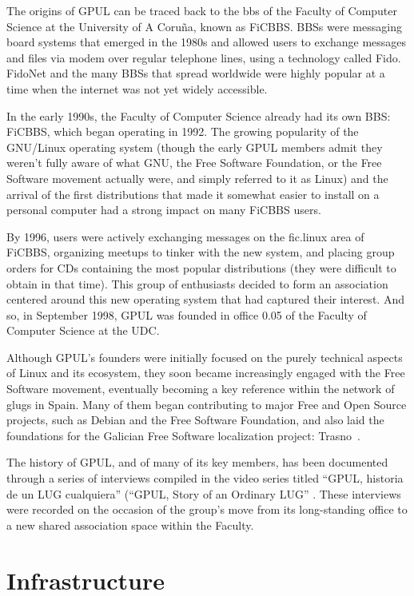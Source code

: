 The origins of GPUL can be traced back to the \gls{bbs} of the Faculty
of Computer Science at the University of A Coruña, known as
FiCBBS. BBSs were messaging board systems that emerged in the 1980s
and allowed users to exchange messages and files via modem over
regular telephone lines, using a technology called Fido. FidoNet and
the many BBSs that spread worldwide were highly popular at a time when
the internet was not yet widely accessible.

In the early 1990s, the Faculty of Computer Science already had its own
BBS: FiCBBS, which began operating in 1992. The growing popularity of the
GNU/Linux operating system (though the early GPUL members admit they
weren’t fully aware of what GNU, the Free Software Foundation, or the
Free Software movement actually were, and simply referred to it as Linux)
and the arrival of the first distributions that made it somewhat easier
to install on a personal computer had a strong impact on many FiCBBS users.

By 1996, users were actively exchanging messages on the fic.linux area
of FiCBBS, organizing meetups to tinker with the new system, and
placing group orders for CDs containing the most popular distributions
(they were difficult to obtain in that time). This group of enthusiasts
decided to form an association centered around this new operating system
that had captured their interest. And so, in September 1998, GPUL was
founded in office 0.05 of the Faculty of Computer Science at the UDC.

Although GPUL's founders were initially focused on the purely
technical aspects of Linux and its ecosystem, they soon became
increasingly engaged with the Free Software movement, eventually
becoming a key reference within the network of \gls{glug}s in
Spain. Many of them began contributing to major Free and Open Source
projects, such as Debian and the Free Software Foundation, and also
laid the foundations for the Galician Free Software localization
project: Trasno~\cite{Trasno}.

The history of GPUL, and of many of its key members, has been
documented through a series of interviews compiled in the video series
titled ``GPUL, historia de un LUG cualquiera'' (``GPUL, Story of an
Ordinary LUG'' \cite{GPULserie}. These interviews were recorded on the
occasion of the group’s move from its long-standing office to a new
shared association space within the Faculty.


\section{Infrastructure}

